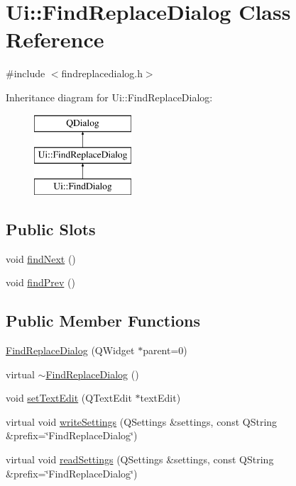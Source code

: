 \hypertarget{class_ui_1_1_find_replace_dialog}{}\section{Ui\+:\+:Find\+Replace\+Dialog Class Reference}
\label{class_ui_1_1_find_replace_dialog}


{\ttfamily \#include $<$findreplacedialog.\+h$>$}

Inheritance diagram for Ui\+:\+:Find\+Replace\+Dialog\+:\begin{figure}[H]
\begin{center}
\leavevmode
\includegraphics[height=3.000000cm]{class_ui_1_1_find_replace_dialog}
\end{center}
\end{figure}
\subsection*{Public Slots}
\begin{DoxyCompactItemize}
\item 
void \hyperlink{class_ui_1_1_find_replace_dialog_ac4d4fa5eb9fdda240d855f05b5b6df68}{find\+Next} ()
\item 
void \hyperlink{class_ui_1_1_find_replace_dialog_af48970c4a221387bc4df6b7f521af693}{find\+Prev} ()
\end{DoxyCompactItemize}
\subsection*{Public Member Functions}
\begin{DoxyCompactItemize}
\item 
\hyperlink{class_ui_1_1_find_replace_dialog_a2631641ec6995a87bc4da0a99fb6f9bd}{Find\+Replace\+Dialog} (Q\+Widget $\ast$parent=0)
\item 
virtual \hyperlink{class_ui_1_1_find_replace_dialog_a03c6e4f0710004d55e45d97b0911cf27}{$\sim$\+Find\+Replace\+Dialog} ()
\item 
void \hyperlink{class_ui_1_1_find_replace_dialog_a3d3cd91477be5d6529e9aa3de21958a6}{set\+Text\+Edit} (Q\+Text\+Edit $\ast$text\+Edit)
\item 
virtual void \hyperlink{class_ui_1_1_find_replace_dialog_ad9216d8059c559596baa5ddcbda3ec0b}{write\+Settings} (Q\+Settings \&settings, const Q\+String \&prefix=\char`\"{}Find\+Replace\+Dialog\char`\"{})
\item 
virtual void \hyperlink{class_ui_1_1_find_replace_dialog_a2be8b8724a5f9a7e6dff30348f94761c}{read\+Settings} (Q\+Settings \&settings, const Q\+String \&prefix=\char`\"{}Find\+Replace\+Dialog\char`\"{})
\end{DoxyCompactItemize}
